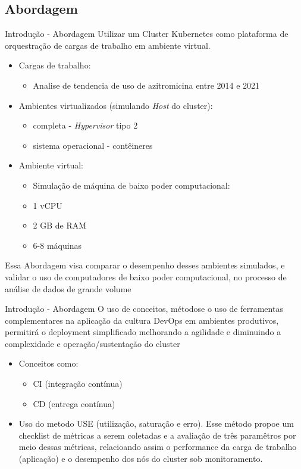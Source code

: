 \documentclass[10pt,brazil]{beamer}
\theoremstyle{definition}
\begin{document}
\subsection{Abordagem}
\begin{frame}{Introdução - Abordagem}
  Utilizar um Cluster Kubernetes como plataforma de orquestração de cargas de trabalho em ambiente virtual.
  \begin{itemize}
    \item Cargas de trabalho:
          \begin{itemize}
            \item Analise de tendencia de uso de azitromicina entre 2014 e 2021
          \end{itemize}
    \item Ambientes virtualizados (simulando \emph{Host} do cluster):
          \begin{itemize}
            \item completa - \emph{Hypervisor} tipo 2
            \item sistema operacional - contêineres
          \end{itemize}
          \framebreak
    \item Ambiente virtual:
          \begin{itemize}
            \item[] Simulação de máquina de baixo poder computacional:
            \item 1 vCPU
            \item 2 GB de RAM
            \item 6-8 máquinas
          \end{itemize}
  \end{itemize}
  Essa Abordagem visa comparar o desempenho desses ambientes simulados, e validar o uso de computadores de baixo poder computacional, no processo de análise de dados de grande volume
\end{frame}

\begin{frame}{Introdução - Abordagem}
  O uso de conceitos, métodose o uso de ferramentas complementares na aplicação da cultura DevOps em ambientes produtivos, permitirá o deployment simplificado melhorando a agilidade e diminuindo a complexidade e operação/sustentação do cluster
  \begin{itemize}
    \item Conceitos como:
          \begin{itemize}
            \item CI (integração contínua)
            \item CD (entrega contínua)
          \end{itemize}
    \item Uso do metodo USE (utilização, saturação e erro). Esse método propoe um checklist de métricas a serem coletadas e a avaliação de três paramêtros por meio dessas métricas, relacioando assim o performance da carga de trabalho (aplicação) e o desempenho dos nós do cluster sob monitoramento.
  \end{itemize}
\end{frame}
\end{document}
